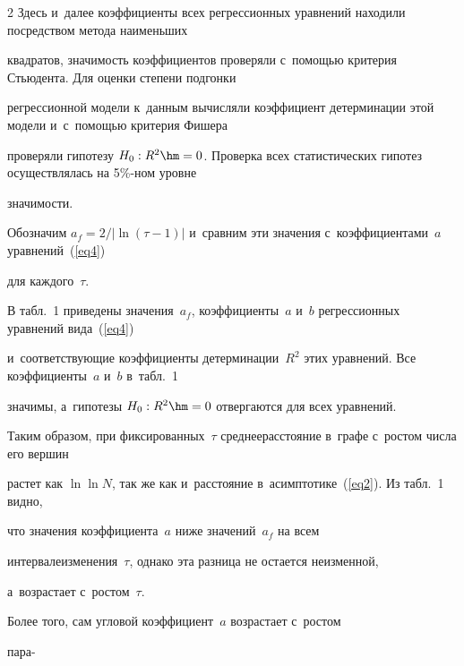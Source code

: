\begin{multicols}{2}
Здесь и~далее коэффициенты всех регрессионных уравнений находили по\-средст\-вом метода наименьших

квадратов, зна\-чи\-мость коэффициентов проверяли с~помощью критерия Стьюдента. Для оценки степени подгонки

регрессионной модели к~данным вы\-чис\-ля\-ли коэффициент детерминации этой модели и~с~по\-мощью критерия Фишера

проверяли гипотезу $H_0: R^2\hm=0$. Проверка всех статистических гипотез осуществлялась на 5\%-ном уровне

зна\-чи\-мости.



Обозначим $a_f={2}/{|\ln(\tau-1)|}$ и~сравним эти значения с~коэффициентами~$a$ уравнений~(\ref{eq4})

для каждого~$\tau$.

В табл.~1 приведены значения~$a_f$, коэффициенты~$a$ и~$b$ регрессионных урав\-не\-ний вида~(\ref{eq4})

и~соответствующие коэффициенты детерминации~$R^2$ этих уравнений. Все коэффициенты~$a$ и~$b$ в~табл.~1

значимы, а~гипотезы $H_0: R^2\hm=0$ отвергаются для всех уравнений.









Таким образом, при фиксированных~$\tau$ сред\-нее\linebreak рас\-сто\-яние в~графе с~рос\-том чис\-ла его вершин\linebreak

рас\-тет как $\ln\ln N$, так же как и~расстояние в~асимп\-то\-ти\-ке~(\ref{eq2}). Из табл.~1 видно,

что значения коэффициента~$a$ ниже значений~$a_f$ на всем

интервале\linebreak  изменения~$\tau$, однако эта разница не остается неизменной,

а~возрастает с~рос\-том~$\tau$.

Более того, сам угловой коэффициент~$a$ возрастает с~рос\-том

па\-ра-\linebreak\vspace*{-12pt}




\begin{center}




\end{center}
\end{multicols}
